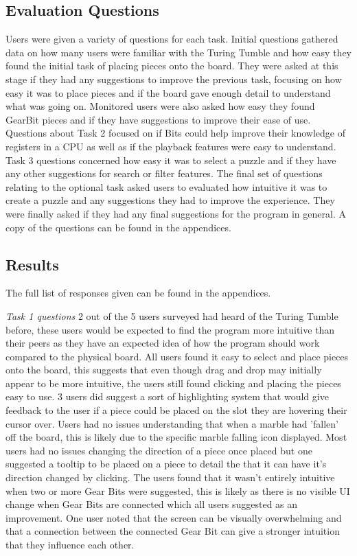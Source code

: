 \documentclass{l4proj}
\begin{document}
\subsection{Evaluation Questions}
Users were given a variety of questions for each task. Initial questions gathered data on how many users were familiar with the Turing Tumble and how easy they found the initial task of placing pieces onto the board. They were asked at this stage if they had any suggestions to improve the previous task, focusing on how easy it was to place pieces and if the board gave enough detail to understand what was going on. Monitored users were also asked how easy they found GearBit pieces and if they have suggestions to improve their ease of use. Questions about Task 2 focused on if Bits could help improve their knowledge of registers in a CPU as well as if the playback features were easy to understand. Task 3 questions concerned how easy it was to select a puzzle and if they have any other suggestions for search or filter features. The final set of questions relating to the optional task asked users to evaluated how intuitive it was to create a puzzle and any suggestions they had to improve the experience. They were finally asked if they had any final suggestions for the program in general. A copy of the questions can be found in the appendices.

\subsection{Results}
The full list of responses given can be found in the appendices.

\emph{Task 1 questions}
2 out of the 5 users surveyed had heard of the Turing Tumble before, these users would be expected to find the program more intuitive than their peers as they have an expected idea of how the program should work compared to the physical board. All users found it easy to select and place pieces onto the board, this suggests that even though drag and drop may initially appear to be more intuitive, the users still found clicking and placing the pieces easy to use. 3 users did suggest a sort of highlighting system that would give feedback to the user if a piece could be placed on the slot they are hovering their cursor over. Users had no issues understanding that when a marble had 'fallen' off the board, this is likely due to the specific marble falling icon displayed. Most users had no issues changing the direction of a piece once placed but one suggested a tooltip to be placed on a piece to detail the that it can have it's direction changed by clicking. The users found that it wasn't entirely intuitive when two or more Gear Bits were suggested, this is likely as there is no visible UI change when Gear Bits are connected which all users suggested as an improvement. One user noted that the screen can be visually overwhelming and that a connection between the connected Gear Bit can give a stronger intuition that they influence each other.
\end{document}
